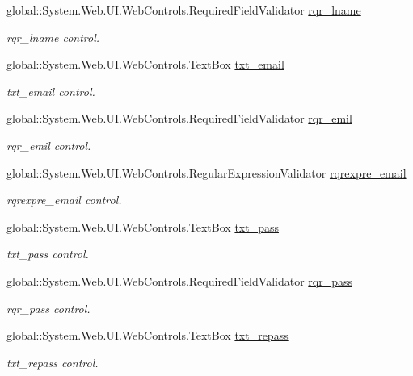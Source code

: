\begin{DoxyCompactItemize}
global\+::\+System.\+Web.\+U\+I.\+Web\+Controls.\+Required\+Field\+Validator \mbox{\hyperlink{classregister_a769c15be2d67d5b9248aac718d9cc08a}{rqr\+\_\+lname}}
\begin{DoxyCompactList}\small\item\em rqr\+\_\+lname control. \end{DoxyCompactList}\item 
global\+::\+System.\+Web.\+U\+I.\+Web\+Controls.\+Text\+Box \mbox{\hyperlink{classregister_af0e86bad54e5e24f260495ae5a3792e4}{txt\+\_\+email}}
\begin{DoxyCompactList}\small\item\em txt\+\_\+email control. \end{DoxyCompactList}\item 
global\+::\+System.\+Web.\+U\+I.\+Web\+Controls.\+Required\+Field\+Validator \mbox{\hyperlink{classregister_a369170eced8c5009ee3e57ce34cf4a3a}{rqr\+\_\+emil}}
\begin{DoxyCompactList}\small\item\em rqr\+\_\+emil control. \end{DoxyCompactList}\item 
global\+::\+System.\+Web.\+U\+I.\+Web\+Controls.\+Regular\+Expression\+Validator \mbox{\hyperlink{classregister_a8044c756d737453ee6ccfb3a734d2cc3}{rqrexpre\+\_\+email}}
\begin{DoxyCompactList}\small\item\em rqrexpre\+\_\+email control. \end{DoxyCompactList}\item 
global\+::\+System.\+Web.\+U\+I.\+Web\+Controls.\+Text\+Box \mbox{\hyperlink{classregister_aa6bb60e9fd1dfe3b087cc4c3b98a55ed}{txt\+\_\+pass}}
\begin{DoxyCompactList}\small\item\em txt\+\_\+pass control. \end{DoxyCompactList}\item 
global\+::\+System.\+Web.\+U\+I.\+Web\+Controls.\+Required\+Field\+Validator \mbox{\hyperlink{classregister_a4d5b8e2bcd936d7fce72c0c6b0f4d960}{rqr\+\_\+pass}}
\begin{DoxyCompactList}\small\item\em rqr\+\_\+pass control. \end{DoxyCompactList}\item 
global\+::\+System.\+Web.\+U\+I.\+Web\+Controls.\+Text\+Box \mbox{\hyperlink{classregister_a22b98218296acba49b2a560998df1533}{txt\+\_\+repass}}
\begin{DoxyCompactList}\small\item\em txt\+\_\+repass control. \end{DoxyCompactList}\item 

\end{DoxyCompactItemize}
